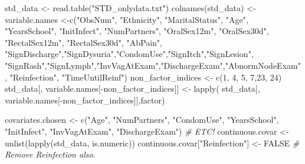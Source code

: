 \documentclass[
]{article}
\newenvironment{Shaded}{\begin{snugshade}}{\end{snugshade}}
\newcommand{\CommentTok}[1]{\textcolor[rgb]{0.56,0.35,0.01}{\textit{#1}}}
\newcommand{\ConstantTok}[1]{\textcolor[rgb]{0.00,0.00,0.00}{#1}}
\newcommand{\DecValTok}[1]{\textcolor[rgb]{0.00,0.00,0.81}{#1}}
\newcommand{\FunctionTok}[1]{\textcolor[rgb]{0.00,0.00,0.00}{#1}}
\newcommand{\NormalTok}[1]{#1}
\newcommand{\OtherTok}[1]{\textcolor[rgb]{0.56,0.35,0.01}{#1}}
\newcommand{\SpecialCharTok}[1]{\textcolor[rgb]{0.00,0.00,0.00}{#1}}
\newcommand{\StringTok}[1]{\textcolor[rgb]{0.31,0.60,0.02}{#1}}
\begin{document}
\begin{Shaded}
\begin{Highlighting}[]
\NormalTok{std\_data }\OtherTok{\textless{}{-}} \FunctionTok{read.table}\NormalTok{(}\StringTok{"STD\_onlydata.txt"}\NormalTok{)}
\FunctionTok{colnames}\NormalTok{(std\_data) }\OtherTok{\textless{}{-}}\NormalTok{ variable.names }\OtherTok{\textless{}{-}}\FunctionTok{c}\NormalTok{(}\StringTok{"ObsNum"}\NormalTok{, }\StringTok{"Ethnicity"}\NormalTok{, }\StringTok{"MaritalStatus"}\NormalTok{, }
        \StringTok{"Age"}\NormalTok{, }\StringTok{"YearsSchool"}\NormalTok{, }\StringTok{"InitInfect"}\NormalTok{, }\StringTok{"NumPartners"}\NormalTok{, }\StringTok{"OralSex12m"}\NormalTok{, }
        \StringTok{"OralSex30d"}\NormalTok{, }\StringTok{"RectalSex12m"}\NormalTok{, }\StringTok{"RectalSex30d"}\NormalTok{, }\StringTok{"AbPain"}\NormalTok{, }
        \StringTok{"SignDischarge"}\NormalTok{,}\StringTok{"SignDysuria"}\NormalTok{,}\StringTok{"CondomUse"}\NormalTok{,}\StringTok{"SignItch"}\NormalTok{,}\StringTok{"SignLesion"}\NormalTok{,}
        \StringTok{"SignRash"}\NormalTok{,}\StringTok{"SignLymph"}\NormalTok{,}\StringTok{"InvVagAtExam"}\NormalTok{,}\StringTok{"DischargeExam"}\NormalTok{,}\StringTok{"AbnormNodeExam"}\NormalTok{, }
        \StringTok{"Reinfection"}\NormalTok{, }\StringTok{"TimeUntilReinf"}\NormalTok{)}
\NormalTok{non\_factor\_indices }\OtherTok{\textless{}{-}} \FunctionTok{c}\NormalTok{(}\DecValTok{1}\NormalTok{, }\DecValTok{4}\NormalTok{, }\DecValTok{5}\NormalTok{, }\DecValTok{7}\NormalTok{,}\DecValTok{23}\NormalTok{, }\DecValTok{24}\NormalTok{) }
\NormalTok{std\_data[, variable.names[}\SpecialCharTok{{-}}\NormalTok{non\_factor\_indices]] }\OtherTok{\textless{}{-}} \FunctionTok{lapply}\NormalTok{(}
\NormalTok{  std\_data[, variable.names[}\SpecialCharTok{{-}}\NormalTok{non\_factor\_indices]],factor)}

\NormalTok{covariates.chosen }\OtherTok{\textless{}{-}} \FunctionTok{c}\NormalTok{(}\StringTok{"Age"}\NormalTok{, }\StringTok{"NumPartners"}\NormalTok{, }\StringTok{"CondomUse"}\NormalTok{, }
                      \StringTok{"YearsSchool"}\NormalTok{, }\StringTok{"InitInfect"}\NormalTok{, }\StringTok{"InvVagAtExam"}\NormalTok{, }\StringTok{"DischargeExam"}\NormalTok{) }\CommentTok{\# ETC!}
\NormalTok{continuous.covar }\OtherTok{\textless{}{-}} \FunctionTok{unlist}\NormalTok{(}\FunctionTok{lapply}\NormalTok{(std\_data, is.numeric)) }
\NormalTok{continuous.covar[}\StringTok{"Reinfection"}\NormalTok{] }\OtherTok{\textless{}{-}} \ConstantTok{FALSE} \CommentTok{\# Remove Reinfection also. }
\end{Highlighting}
\end{Shaded}
\end{document}
